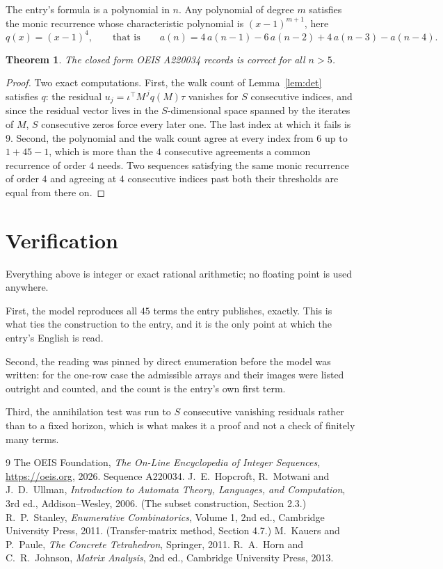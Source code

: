 \documentclass[11pt,a4paper]{article}
\theoremstyle{plain}
\newtheorem{theorem}{Theorem}
\theoremstyle{definition}
\begin{document}
The entry's formula is a polynomial in $n$. Any polynomial of degree $m$ satisfies the monic
recurrence whose characteristic polynomial is $(x-1)^{m+1}$, here
\[
q(x)=(x-1)^{4},\qquad\text{that is}\qquad a(n)=4\,a(n-1) - 6\,a(n-2) + 4\,a(n-3) - a(n-4).
\]

\begin{theorem}
The closed form OEIS A220034 records is correct for all $n>5$.
\end{theorem}

\begin{proof}
Two exact computations. First, the walk count of Lemma~\ref{lem:det} satisfies $q$: the
residual $u_j=\iota^{\!\top}M^{\,j}q(M)\tau$ vanishes for $S$ consecutive indices, and
since the residual vector lives in the $S$-dimensional space spanned by the iterates of $M$,
$S$ consecutive zeros force every later one. The last index at which it fails is $9$.
Second, the polynomial and the walk count agree at every index from $6$ up to
$1 + 45 - 1$, which is more than the $4$ consecutive agreements a
common recurrence of order $4$ needs. Two sequences satisfying the same monic recurrence
of order $4$ and agreeing at $4$ consecutive indices past both their thresholds are
equal from there on.
\end{proof}

\section{Verification}

Everything above is integer or exact rational arithmetic; no floating point is used anywhere.

First, the model reproduces all $45$ terms the entry publishes, exactly. This is what
ties the construction to the entry, and it is the only point at which the entry's English is
read.

Second, the reading was pinned by direct enumeration before the model was written: for the
one-row case the admissible arrays and their images were listed outright and counted, and the
count is the entry's own first term.

Third, the annihilation test was run to $S$ consecutive vanishing residuals rather than to a
fixed horizon, which is what makes it a proof and not a check of finitely many terms.

\begin{thebibliography}{9}
 The OEIS Foundation, \emph{The On-Line Encyclopedia of Integer
Sequences}, \url{https://oeis.org}, 2026. Sequence A220034.
 J.~E.~Hopcroft, R.~Motwani and J.~D.~Ullman, \emph{Introduction to Automata
Theory, Languages, and Computation}, 3rd ed., Addison--Wesley, 2006. (The subset
construction, Section 2.3.)
 R.~P.~Stanley, \emph{Enumerative Combinatorics}, Volume 1, 2nd ed.,
Cambridge University Press, 2011. (Transfer-matrix method, Section 4.7.)
 M.~Kauers and P.~Paule, \emph{The Concrete Tetrahedron}, Springer, 2011.
 R.~A.~Horn and C.~R.~Johnson, \emph{Matrix Analysis}, 2nd ed., Cambridge
University Press, 2013.
\end{thebibliography}
\end{document}

